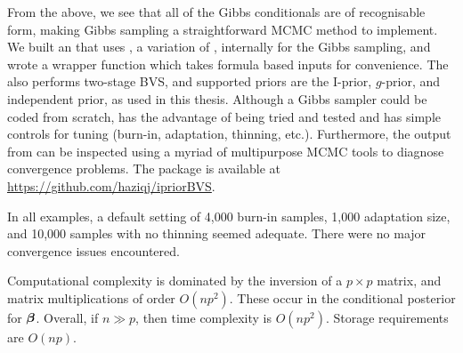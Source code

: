 From the above, we see that all of the Gibbs conditionals are of recognisable form, making Gibbs sampling a straightforward MCMC method to implement.
We built an    that uses  \citep{plummer2003jags}, a variation of , internally for the Gibbs sampling, and wrote a wrapper function which takes formula based inputs for convenience.
The  also performs two-stage BVS, and supported priors are the I-prior, $g$-prior, and independent prior, as used in this thesis.
Although a Gibbs sampler could be coded from scratch,  has the advantage of being tried and tested and has simple controls for tuning (burn-in, adaptation, thinning, etc.).
Furthermore, the output from  can be inspected using a myriad of multipurpose MCMC tools to diagnose convergence problems.
The  package is available at \url{https://github.com/haziqj/ipriorBVS}.

In all examples, a default setting of 4,000 burn-in samples, 1,000 adaptation size, and 10,000 samples with no thinning seemed adequate.
There were no major convergence issues encountered.

Computational complexity is dominated by the inversion of a $p \times p$ matrix, and matrix multiplications of order $O(np^2)$.
These occur in the conditional posterior for ${\bm\beta}$.
Overall, if $n \gg p$, then time complexity is $O(np^2)$.
Storage requirements are $O(np)$.
